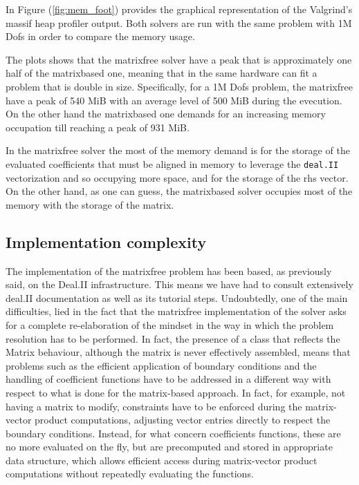 \documentclass{article}
\begin{document}
In Figure (\ref{fig:mem_foot}) provides the graphical representation of the Valgrind's massif heap profiler output. Both solvers are run with the same problem with 1M Dofs in order to compare the memory usage.

The plots shows that the matrixfree solver have a peak that is approximately one half of the matrixbased one, meaning that in the same hardware can fit a problem that is double in size. Specifically, for a 1M Dofs problem, the matrixfree have a peak of 540 MiB with an average level of 500 MiB during the evecution. On the other hand the matrixbased one demands for an increasing memory occupation till reaching a peak of 931 MiB.

In the matrixfree solver the most of the memory demand is for the storage of the evaluated coefficients that must be aligned in memory to leverage the \verb|deal.II| vectorization and so occupying more space, and for the storage of the rhs vector.
On the other hand, as one can guess, the matrixbased solver occupies most of the memory with the storage of the matrix.




\subsection{Implementation complexity}
The implementation of the matrixfree problem has been based, as previously said, on the Deal.II infrastructure. This means we have had to consult extensively deal.II documentation as well as its tutorial steps.
Undoubtedly, one of the main difficulties, lied in the fact that the matrixfree implementation of the solver asks for a complete re-elaboration of the mindset in the way in which the problem resolution has to be performed. In fact, the presence of a class that reflects the Matrix behaviour, although the matrix is never effectively assembled, means that problems such as the efficient application of boundary conditions and the handling of coefficient functions have to be addressed in a different way with respect to what is done for the matrix-based approach. In fact, for example, not having a matrix to modify, constraints have to be enforced during the matrix-vector product computations, adjusting vector entries directly to respect the boundary conditions. Instead, for what concern coefficients functions, these are no more evaluated on the fly, but are precomputed and stored in appropriate data structure, which allows efficient access during matrix-vector product computations without repeatedly evaluating the functions.
\end{document}
